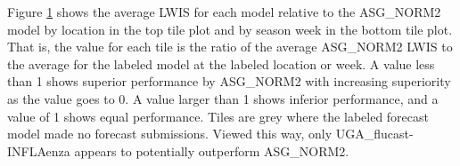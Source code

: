 Figure \ref{fig:state_and_date_lwis} shows the average LWIS for each model
relative to the ASG\_NORM2 model by location in the top tile plot and by 
season week in the bottom tile plot. That is, the value for each tile is the 
ratio of the average ASG\_NORM2 LWIS to the average for the labeled model at the
labeled location or week. A value less than 1 shows superior performance by
ASG\_NORM2 with increasing superiority as the value goes to 0. A value larger
than 1 shows inferior performance, and a value of 1 shows equal performance.
Tiles are grey where the labeled forecast model made no forecast submissions.
Viewed this way, only UGA\_flucast-INFLAenza appears to potentially outperform
ASG\_NORM2.

\begin{figure}[hbt!]
\begin{adjustwidth}{-3cm}{-1.5cm}
    \centering
    \end{adjustwidth}
    \caption{}
    \label{fig:state_and_date_lwis}
    
\end{figure}



